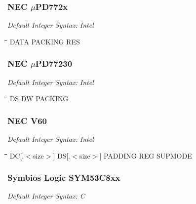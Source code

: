 \subsubsection{NEC $\mu$PD772x}

{\em Default Integer Syntax: Intel}

{\tt\begin{tabbing}
\hspace{3cm}\=\hspace{3cm}\=\hspace{3cm}\=\hspace{3cm}\=\kill
DATA       \> PACKING     \> RES \\
\end{tabbing}}

\subsubsection{NEC $\mu$PD77230}

{\em Default Integer Syntax: Intel}

{\tt\begin{tabbing} 
\hspace{3cm}\=\hspace{3cm}\=\hspace{3cm}\=\hspace{3cm}\=\kill
DS         \> DW          \> PACKING \\
\end{tabbing}}

\subsubsection{NEC V60}

{\em Default Integer Syntax: Intel}

{\tt\begin{tabbing}
\hspace{3cm}\=\hspace{3cm}\=\hspace{3cm}\=\hspace{3cm}\=\kill
DC[.$<$size$>$]\> DS[.$<$size$>$] \> PADDING \> REG         \> SUPMODE \\
\end{tabbing}}

\subsubsection{Symbios Logic SYM53C8xx}

{\em Default Integer Syntax: C}

